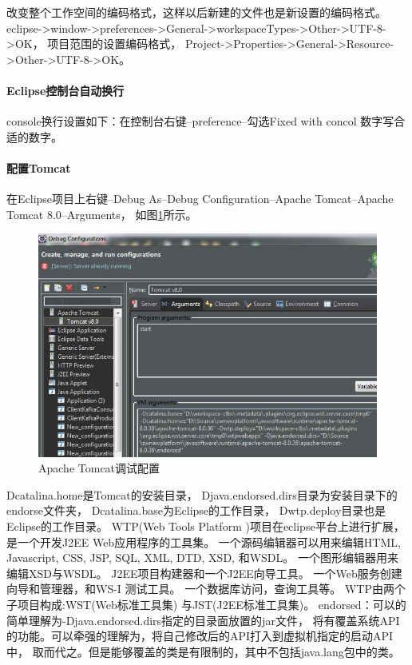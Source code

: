 \documentclass{book}
\begin{document}
改变整个工作空间的编码格式，这样以后新建的文件也是新设置的编码格式。
eclipse->window->preferences->General->workspaceTypes->Other->UTF-8->OK，
项目范围的设置编码格式，
Project->Properties->General->Resource->Other->UTF-8->OK。

\paragraph{Eclipse控制台自动换行}

console换行设置如下：在控制台右键--preference--勾选Fixed with concol 数字写合适的数字。

\paragraph{配置Tomcat}

在Eclipse项目上右键--Debug As--Debug Configuration--Apache Tomcat--Apache Tomcat 8.0--Arguments，
如图\ref{code:ApacheTomcatDebugConfiguration}所示。

\begin{figure}[htbp]
	\centering
	\includegraphics[scale=0.5]{ApacheTomcatDebugConfiguration.jpg}
	\caption{Apache Tomcat调试配置}
	\label{code:ApacheTomcatDebugConfiguration}
\end{figure}

Dcatalina.home是Tomcat的安装目录，
Djava.endorsed.dirs目录为安装目录下的endorse文件夹，
Dcatalina.base为Eclipse的工作目录，
Dwtp.deploy目录也是Eclipse的工作目录。
WTP(Web Tools Platform )项目在eclipse平台上进行扩展，是一个开发J2EE Web应用程序的工具集。
一个源码编辑器可以用来编辑HTML, Javascript, CSS, JSP, SQL, XML, DTD, XSD, 和WSDL。
一个图形编辑器用来编辑XSD与WSDL。
J2EE项目构建器和一个J2EE向导工具。
一个Web服务创建向导和管理器，和WS-I 测试工具。
一个数据库访问，查询工具等。
WTP由两个子项目构成:WST(Web标准工具集) 与JST(J2EE标准工具集)。
endorsed：可以的简单理解为-Djava.endorsed.dirs指定的目录面放置的jar文件，
将有覆盖系统API的功能。可以牵强的理解为，将自己修改后的API打入到虚拟机指定的启动API中，
取而代之。但是能够覆盖的类是有限制的，其中不包括java.lang包中的类。
\end{document}
